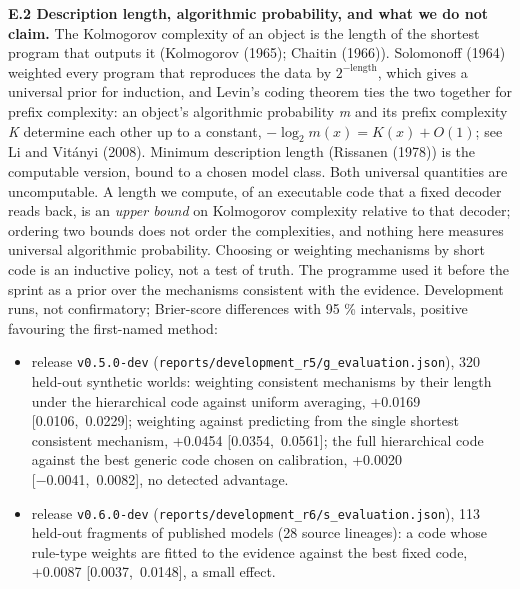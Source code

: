 \documentclass[
  10pt,
]{article}
\providecommand{\tightlist}{%
  \setlength{\itemsep}{0pt}\setlength{\parskip}{0pt}}
\begin{document}
\textbf{E.2 Description length, algorithmic probability, and what we do
not claim.} The Kolmogorov complexity of an object is the length of the
shortest program that outputs it (Kolmogorov (1965); Chaitin (1966)).
Solomonoff (1964) weighted every program that reproduces the data by
\(2^{-\textrm{length}}\), which gives a universal prior for induction,
and Levin's coding theorem ties the two together for prefix complexity:
an object's algorithmic probability \emph{m} and its prefix complexity
\emph{K} determine each other up to a constant,
\(-\log_2 m(x) = K(x) + O(1)\); see Li and Vitányi (2008). Minimum
description length (Rissanen (1978)) is the computable version, bound to
a chosen model class. Both universal quantities are uncomputable. A
length we compute, of an executable code that a fixed decoder reads
back, is an \emph{upper bound} on Kolmogorov complexity relative to that
decoder; ordering two bounds does not order the complexities, and
nothing here measures universal algorithmic probability. Choosing or
weighting mechanisms by short code is an inductive policy, not a test of
truth. The programme used it before the sprint as a prior over the
mechanisms consistent with the evidence. Development runs, not
confirmatory; Brier-score differences with 95 \% intervals, positive
favouring the first-named method:

\begin{itemize}
\tightlist
\item
  release \texttt{v0.5.0-dev}
  (\texttt{reports/development\_r5/g\_evaluation.json}), 320 held-out
  synthetic worlds: weighting consistent mechanisms by their length
  under the hierarchical code against uniform averaging, +0.0169
  {[}0.0106,~0.0229{]}; weighting against predicting from the single
  shortest consistent mechanism, +0.0454 {[}0.0354,~0.0561{]}; the full
  hierarchical code against the best generic code chosen on calibration,
  +0.0020 {[}−0.0041,~0.0082{]}, no detected advantage.
\item
  release \texttt{v0.6.0-dev}
  (\texttt{reports/development\_r6/s\_evaluation.json}), 113 held-out
  fragments of published models (28 source lineages): a code whose
  rule-type weights are fitted to the evidence against the best fixed
  code, +0.0087 {[}0.0037,~0.0148{]}, a small effect.
\end{itemize}
\end{document}
